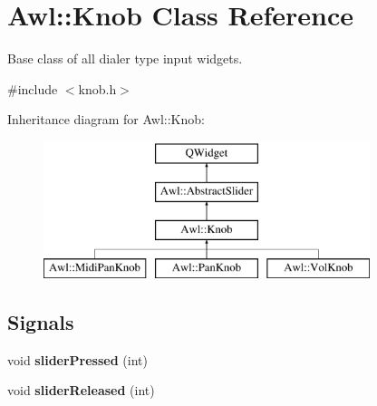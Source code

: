 \hypertarget{class_awl_1_1_knob}{}\section{Awl\+:\+:Knob Class Reference}
\label{class_awl_1_1_knob}


Base class of all dialer type input widgets.  




{\ttfamily \#include $<$knob.\+h$>$}

Inheritance diagram for Awl\+:\+:Knob\+:\begin{figure}[H]
\begin{center}
\leavevmode
\includegraphics[height=4.000000cm]{class_awl_1_1_knob}
\end{center}
\end{figure}
\subsection*{Signals}
\begin{DoxyCompactItemize}
\item 
\mbox{\label{class_awl_1_1_knob_a08e5968f6538ea9cc8b92468269d80df}} 
void {\bfseries slider\+Pressed} (int)
\item 
\mbox{\label{class_awl_1_1_knob_aaedbe8a843227b3b3d1fd446bc9346e6}} 
void {\bfseries slider\+Released} (int)
\end{DoxyCompactItemize}

